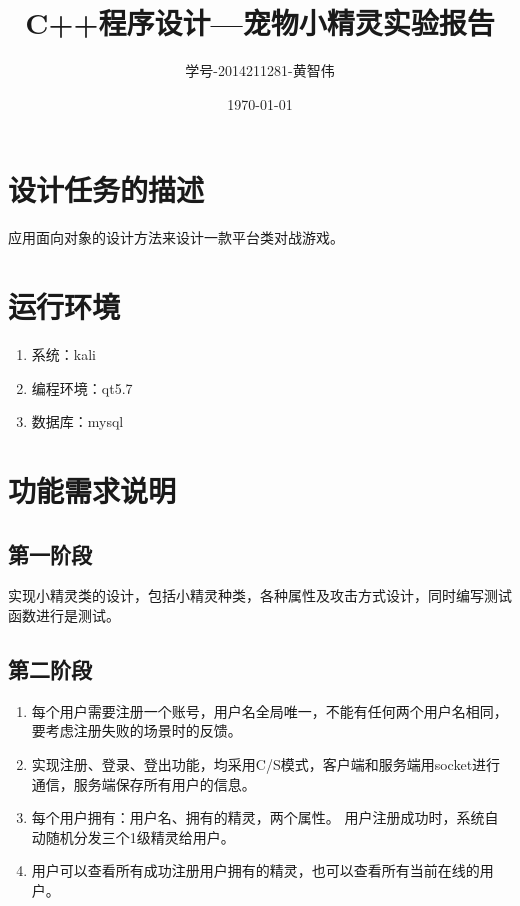 \documentclass{ctexart}
\begin{document}
\title{\heiti C++程序设计---宠物小精灵实验报告}
\author{学号-2014211281-黄智伟}
\date{\today}

\maketitle
\tableofcontents

\pagebreak[4]

\section{设计任务的描述}
\label{sec:purpose}
应用面向对象的设计方法来设计一款平台类对战游戏。

\section{运行环境}
\label{sec:environment}
\begin{enumerate}
  \item 系统：kali
  \item 编程环境：qt5.7
  \item 数据库：mysql
\end{enumerate}

\section{功能需求说明}
\label{sec:demand}
\subsection{第一阶段}
实现小精灵类的设计，包括小精灵种类，各种属性及攻击方式设计，同时编写测试函数进行是测试。
\subsection{第二阶段}
\begin{enumerate}
  \item 每个用户需要注册一个账号，用户名全局唯一，不能有任何两个用户名相同，要考虑注册失败的场景时的反馈。
  \item 实现注册、登录、登出功能，均采用C/S模式，客户端和服务端用socket进行通信，服务端保存所有用户的信息。
  \item 每个用户拥有：用户名、拥有的精灵，两个属性。 用户注册成功时，系统自动随机分发三个1级精灵给用户。
  \item 用户可以查看所有成功注册用户拥有的精灵，也可以查看所有当前在线的用户。
\end{enumerate}
\end{document}
